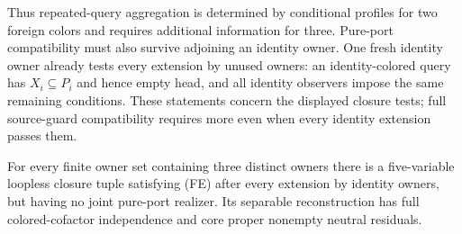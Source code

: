 Thus repeated-query aggregation is determined by conditional profiles
for two foreign colors and requires additional information for three.
Pure-port compatibility must also survive adjoining an identity owner.
One fresh identity owner already tests every extension by unused owners:
an identity-colored query has $X_i\subseteq P_i$ and hence empty head,
and all identity observers impose the same remaining conditions.
These statements concern the displayed closure tests; full source-guard
compatibility requires more even when every identity extension passes them.

\begin{theorem}
\label{core:thm:identity-stable-feedback}
For every finite owner set containing three distinct owners there is a
five-variable loopless closure tuple satisfying (FE) after every extension
by identity owners, but having no joint pure-port realizer. Its separable
reconstruction has full colored-cofactor independence and core proper
nonempty neutral residuals.
\end{theorem}
